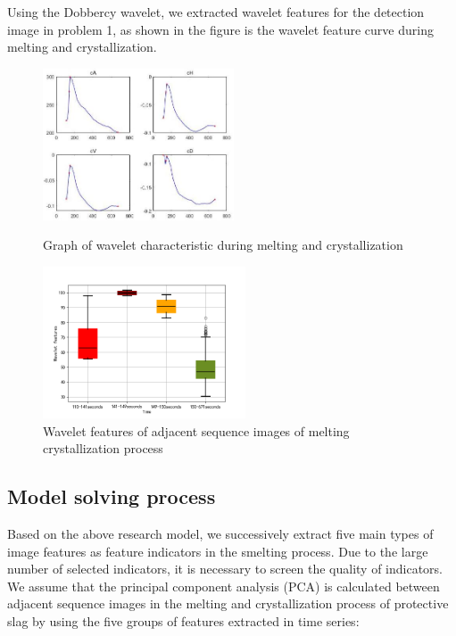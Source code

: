 \documentclass{apmcmthesis}
\begin{document}
		Using the Dobbercy wavelet, we extracted wavelet features for the detection image in problem 1, as shown in the figure is the wavelet feature curve during melting and crystallization.\newpage
\begin{figure}[htbp!]
	\begin{minipage}{0.49\linewidth}
		\centering
	\includegraphics[height=4.5cm]{./figures/6-2-fe.jpg}
	\caption{Graph of wavelet characteristic during melting and crystallization}
	\end{minipage}
	\begin{minipage}{0.49\linewidth}
		\centering
		\includegraphics[height=4.5cm]{./figures/6-3-wave.png}
		\caption{Wavelet features of adjacent sequence images of melting crystallization process}
		\label{fig:9}
	\end{minipage}	
\end{figure}

	\subsection{Model solving process}
	
		Based on the above research model,  we successively extract five main types of image features as feature indicators in the smelting process. Due to the  large number of selected indicators,  it is necessary to screen the quality of indicators. We assume that the principal component analysis (PCA) is calculated  between adjacent sequence images in the melting and crystallization process of protective slag by using the five groups  of features extracted in time series:
		
\end{document}

